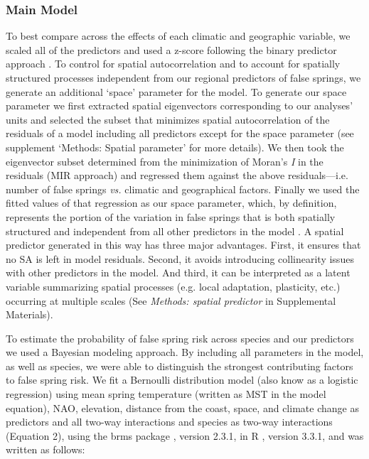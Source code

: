 \documentclass{article}\usepackage[]{graphicx}\usepackage[]{color}
\begin{document}
\subsubsection*{Main Model}
To best compare across the effects of each climatic and geographic variable, we scaled all of the predictors and used a z-score following the binary predictor approach \citep{Gelman2006}. To control for spatial autocorrelation and to account for spatially structured processes independent from our regional predictors of false springs, we generate an additional `space' parameter for the model. To generate our space parameter we first extracted spatial eigenvectors corresponding to our analyses' units and selected the subset that minimizes spatial autocorrelation of the residuals of a model including all predictors except for the space parameter \citep{diniz2012selection,Baumen2017} (see supplement `Methods: Spatial parameter' for more details). We then took the eigenvector subset determined from the minimization of Moran's \textit{I} in the residuals (MIR approach) and regressed them against the above residuals---i.e. number of false springs \emph{vs.} climatic and geographical factors. Finally we used the fitted values of that regression as our space parameter, which, by definition, represents the portion of the variation in false springs that is both spatially structured and independent from all other predictors in the model \citep[e.g. average spring temperature, elevation, etc.][]{griffith2006spatial,morales2012imprint}. A spatial predictor generated in this way has three major advantages. First, it ensures that no SA is left in model residuals. Second, it avoids introducing collinearity issues with other predictors in the model. And third, it can be interpreted as a latent variable summarizing spatial processes (e.g. local adaptation, plasticity, etc.) occurring at multiple scales (See \textit{Methods: spatial predictor} in Supplemental Materials).

To estimate the probability of false spring risk across species and our predictors we used a Bayesian modeling approach. By including all parameters in the model, as well as species, we were able to distinguish the strongest contributing factors to false spring risk. We fit a Bernoulli distribution model (also know as a logistic regression) using mean spring temperature (written as MST in the model equation), NAO, elevation, distance from the coast, space, and climate change as predictors and all two-way interactions and species as two-way interactions (Equation 2), using the brms package \citep{brms}, version 2.3.1,  in R \citep{R}, version 3.3.1, and was written as follows:
\end{document}
